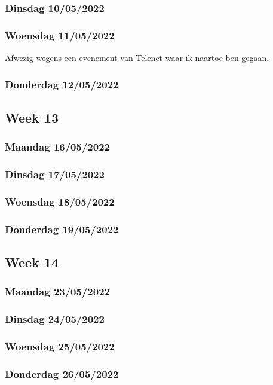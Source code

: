 \subsubsection{Dinsdag 10/05/2022}

\subsubsection{Woensdag 11/05/2022}

Afwezig wegens een evenement van Telenet waar ik naartoe ben gegaan.

\subsubsection{Donderdag 12/05/2022}

\subsection{Week 13}

\subsubsection{Maandag 16/05/2022}

\subsubsection{Dinsdag 17/05/2022}

\subsubsection{Woensdag 18/05/2022}

\subsubsection{Donderdag 19/05/2022}

\subsection{Week 14}

\subsubsection{Maandag 23/05/2022}

\subsubsection{Dinsdag 24/05/2022}

\subsubsection{Woensdag 25/05/2022}

\subsubsection{Donderdag 26/05/2022}